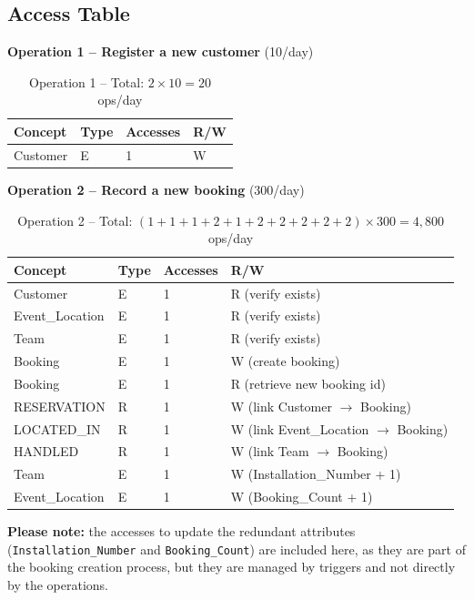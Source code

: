 \documentclass[12pt]{article}
\begin{document}
\subsection{Access Table}

\noindent\textbf{Operation 1 -- Register a new customer} (10/day)
\begin{table}[H]
  \renewcommand{\arraystretch}{1.3}
  \begin{tabularx}{\textwidth}{|X|X|X|X|}
  \hline \textbf{Concept} & \textbf{Type} & \textbf{Accesses} & \textbf{R/W} \\ \hline
  Customer & E & 1 & W \\ \hline
  \end{tabularx}
  \caption{Operation 1 -- Total: $2 \times 10 = 20$ ops/day}
\end{table}

\noindent\textbf{Operation 2 -- Record a new booking} (300/day)
\begin{table}[H]
  \renewcommand{\arraystretch}{1.3}
  \begin{tabularx}{\textwidth}{|X|X|X|X|}
  \hline \textbf{Concept} & \textbf{Type} & \textbf{Accesses} & \textbf{R/W} \\ \hline
  Customer        & E & 1 & R (verify exists) \\ \hline
  Event\_Location & E & 1 & R (verify exists) \\ \hline
  Team            & E & 1 & R (verify exists) \\ \hline
  Booking         & E & 1 & W (create booking) \\ \hline
  Booking         & E & 1 & R (retrieve new booking id) \\ \hline
  RESERVATION     & R & 1 & W (link Customer $\to$ Booking) \\ \hline
  LOCATED\_IN     & R & 1 & W (link Event\_Location $\to$ Booking) \\ \hline
  HANDLED         & R & 1 & W (link Team $\to$ Booking) \\ \hline
  Team            & E & 1 & W (Installation\_Number + 1) \\ \hline
  Event\_Location & E & 1 & W (Booking\_Count + 1) \\ \hline
  \end{tabularx}
\caption{Operation 2 -- Total: $(1+1+1+2+1+2+2+2+2+2) \times 300 = 4{,}800$ ops/day}
\end{table}
\textbf{Please note:} the accesses to update the redundant attributes (\texttt{Installation\_Number} and \texttt{Booking\_Count}) 
are included here, as they are part of the booking creation process, but they are managed by triggers and not directly by the operations.
\end{document}
